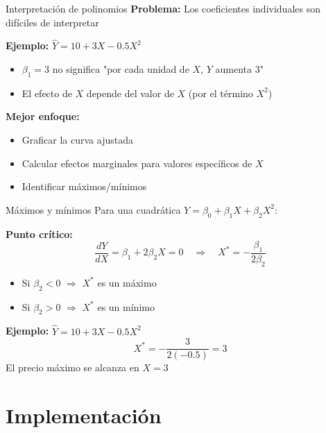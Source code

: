 \documentclass[aspectratio=169]{beamer}
\begin{document}
\begin{frame}{Interpretación de polinomios}
\textbf{Problema:} Los coeficientes individuales son difíciles de interpretar

\vspace{0.3cm}
\textbf{Ejemplo:} $\hat{Y} = 10 + 3X - 0.5X^2$
\begin{itemize}
    \item $\beta_1 = 3$ no significa "por cada unidad de $X$, $Y$ aumenta 3"
    \item El efecto de $X$ depende del valor de $X$ (por el término $X^2$)
\end{itemize}

\vspace{0.5cm}
\textbf{Mejor enfoque:}
\begin{itemize}
    \item Graficar la curva ajustada
    \item Calcular efectos marginales para valores específicos de $X$
    \item Identificar máximos/mínimos
\end{itemize}
\end{frame}

\begin{frame}{Máximos y mínimos}
Para una cuadrática $Y = \beta_0 + \beta_1 X + \beta_2 X^2$:

\vspace{0.3cm}
\textbf{Punto crítico:}
\[
\frac{dY}{dX} = \beta_1 + 2\beta_2 X = 0 \quad \Rightarrow \quad X^* = -\frac{\beta_1}{2\beta_2}
\]

\vspace{0.3cm}
\begin{itemize}
    \item Si $\beta_2 < 0$ $\Rightarrow$ $X^*$ es un máximo
    \item Si $\beta_2 > 0$ $\Rightarrow$ $X^*$ es un mínimo
\end{itemize}

\vspace{0.5cm}
\textbf{Ejemplo:} $\hat{Y} = 10 + 3X - 0.5X^2$
\[
X^* = -\frac{3}{2(-0.5)} = 3
\]
El precio máximo se alcanza en $X = 3$
\end{frame}

\section{Implementación}
\end{document}
